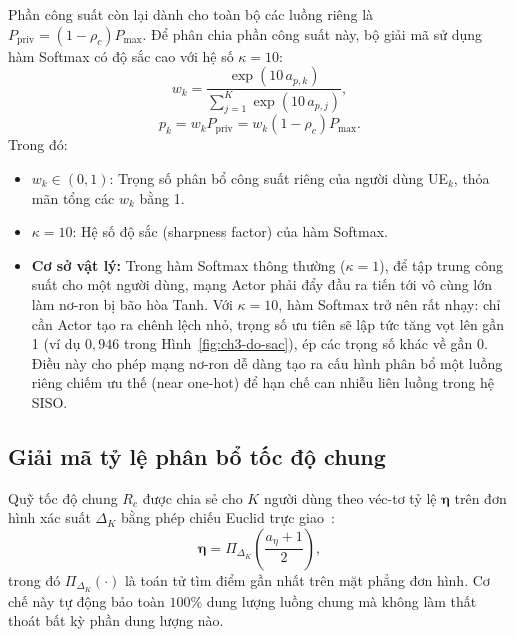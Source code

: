 Phần công suất còn lại dành cho toàn bộ các luồng riêng là $P_{\mathrm{priv}} = (1 - \rho_c) P_{\max}$. Để phân
chia phần công suất này, bộ giải mã sử dụng hàm Softmax có độ sắc cao với hệ số $\kappa = 10$:
\begin{equation}
w_k = \frac{\exp(10\, a_{p,k})}{\sum_{j=1}^{K} \exp(10\, a_{p,j})},
\label{eq:softmax}
\end{equation}
\begin{equation}
p_k = w_k P_{\mathrm{priv}} = w_k (1 - \rho_c) P_{\max}.
\label{eq:p-k}
\end{equation}
Trong đó:
\begin{itemize}
\item $w_k \in (0, 1)$: Trọng số phân bổ công suất riêng của người dùng UE$_k$, thỏa mãn tổng các $w_k$ bằng 1.
\item $\kappa = 10$: Hệ số độ sắc (sharpness factor) của hàm Softmax.
\item \textbf{Cơ sở vật lý:} Trong hàm Softmax thông thường ($\kappa = 1$), để tập trung công suất cho một người
  dùng, mạng Actor phải đẩy đầu ra tiến tới vô cùng lớn làm nơ-ron bị bão hòa Tanh. Với $\kappa = 10$, hàm Softmax
  trở nên rất nhạy: chỉ cần Actor tạo ra chênh lệch nhỏ, trọng số ưu tiên sẽ lập tức tăng vọt lên gần 1 (ví dụ
  $0,946$ trong Hình~\ref{fig:ch3-do-sac}), ép các trọng số khác về gần 0. Điều này cho phép mạng nơ-ron dễ dàng
  tạo ra cấu hình phân bổ một luồng riêng chiếm ưu thế (near one-hot) để hạn chế can nhiễu liên luồng trong hệ
  SISO.
\end{itemize}



\subsection{Giải mã tỷ lệ phân bổ tốc độ chung}
\label{ssec:giai-ma-ty-le-toc-do}

Quỹ tốc độ chung $R_c$ được chia sẻ cho $K$ người dùng theo véc-tơ tỷ lệ $\boldsymbol{\eta}$ trên đơn hình xác
suất $\Delta_K$ bằng phép chiếu Euclid trực giao~\cite{Duchi2008Projection}:
\begin{equation}
\boldsymbol{\eta} = \Pi_{\Delta_K}\!\left(\frac{a_\eta + 1}{2}\right),
\label{eq:eta}
\end{equation}
trong đó $\Pi_{\Delta_K}(\cdot)$ là toán tử tìm điểm gần nhất trên mặt phẳng đơn hình. Cơ chế này tự động bảo
toàn $100\%$ dung lượng luồng chung mà không làm thất thoát bất kỳ phần dung lượng nào.

